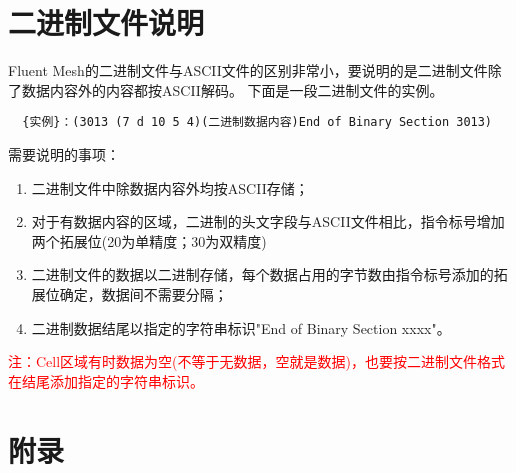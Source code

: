 \documentclass[lang=cn,11pt,a4paper]{elegantpaper} %
\begin{document}
\section{二进制文件说明}

Fluent Mesh的二进制文件与ASCII文件的区别非常小，要说明的是二进制文件除了数据内容外的内容都按ASCII解码。
下面是一段二进制文件的实例。

\begin{lstlisting}
  {实例}：(3013 (7 d 10 5 4)(二进制数据内容)End of Binary Section 3013)
\end{lstlisting}

需要说明的事项：
\begin{enumerate}
  \item 二进制文件中除数据内容外均按ASCII存储；
  \item 对于有数据内容的区域，二进制的头文字段与ASCII文件相比，指令标号增加两个拓展位(20为单精度；30为双精度)
  \item 二进制文件的数据以二进制存储，每个数据占用的字节数由指令标号添加的拓展位确定，数据间不需要分隔；
  \item 二进制数据结尾以指定的字符串标识"End of Binary Section xxxx"。
\end{enumerate}
\textcolor{red}{注：Cell区域有时数据为空(不等于无数据，空就是数据)，也要按二进制文件格式在结尾添加指定的字符串标识。}


\section{附录}
\end{document}
